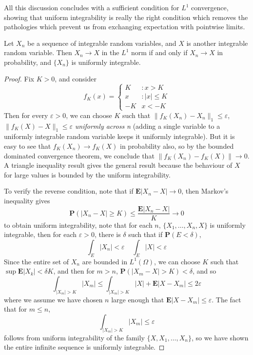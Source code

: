 All this discussion concludes with a sufficient condition for $L^1$ convergence, showing that uniform integrability is really the right condition which removes the pathologies which prevent us from exchanging expectation with pointwise limits.

\begin{theorem}
    Let $X_n$ be a sequence of integrable random variables, and $X$ is another integrable random variable. Then $X_n \to X$ in the $L^1$ norm if and only if $X_n \to X$ in probability, and $\{ X_n \}$ is uniformly integrable.
\end{theorem}
\begin{proof}
    Fix $K > 0$, and consider
    \[ f_K(x) = \begin{cases} K &: x > K \\ x & :|x| \leq K\\ -K & x < -K \end{cases} \]
    Then for every $\varepsilon > 0$, we can choose $K$ such that $\| f_K(X_n) - X_n \|_1 \leq \varepsilon$, $\| f_K(X) - X \|_1 \leq \varepsilon$ {\it uniformly across n} (adding a single variable to a uniformly integrable random variable keeps it uniformly integrable). But it is easy to see that $f_K(X_n) \to f_K(X)$ in probability also, so by the bounded dominated convergence theorem, we conclude that $\| f_K(X_n) - f_K(X) \| \to 0$. A triangle inequality result gives the general result because the behaviour of $X$ for large values is bounded by the uniform integrability.

    To verify the reverse condition, note that if $\mathbf{E}|X_n - X| \to 0$, then Markov's inequality gives
    \[ \mathbf{P}(|X_n - X| \geq K) \leq \frac{\mathbf{E}|X_n - X|}{K} \to 0 \]
    to obtain uniform integrability, note that for each $n$, $\{ X_1, \dots, X_n, X \}$ is uniformly integrable, then for each $\varepsilon > 0$, there is $\delta$ such that if $\mathbf{P}(E < \delta)$,
    \[ \int_E |X_n| < \varepsilon\ \ \ \ \ \int_E |X| < \varepsilon \]
    Since the entire set of $X_n$ are bounded in $L^1(\Omega)$, we can choose $K$ such that $\sup \mathbf{E} |X_k| < \delta K$, and then for $m > n$, $\mathbf{P}(|X_m - X| > K) < \delta$, and so
    \[ \int_{|X_m| > K} |X_m| \leq \int_{|X_m| > K} |X| + \mathbf{E}|X - X_m| \leq 2\varepsilon \]
    where we assume we have chosen $n$ large enough that $\mathbf{E}|X - X_m| \leq \varepsilon$. The fact that for $m \leq n$,
    \[ \int_{|X_m| > K} |X_m| \leq \varepsilon \]
    follows from uniform integrability of the family $\{ X, X_1, \dots, X_n \}$, so we have shown the entire infinite sequence is uniformly integrable.
\end{proof}














